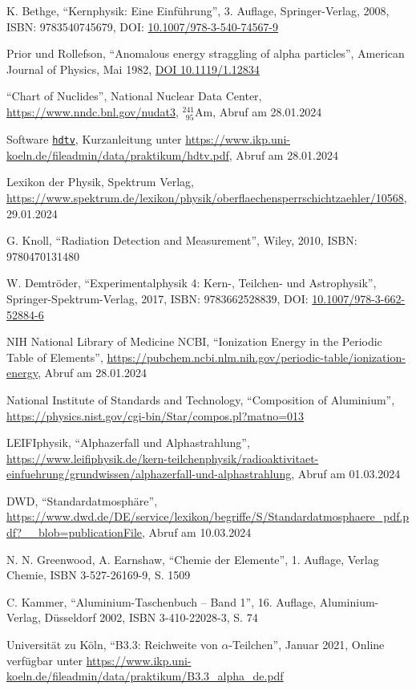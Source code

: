 \documentclass[12pt,a4paper]{scrartcl}
\numberwithin{equation}{section} %
\begin{document}
\begin{thebibliography}{99}
	K. Bethge, ``Kernphysik: Eine Einführung'', 3. Auflage,
	Springer-Verlag, 2008, ISBN: 9783540745679, DOI:
	\href{https://doi.org/10.1007/978-3-540-74567-9}{10.1007/978-3-540-74567-9}

	Prior und Rollefson, ``Anomalous energy straggling of alpha
	particles'', American Journal of Physics, Mai 1982,
	\href{https://doi.org/10.1119/1.12834}{DOI 10.1119/1.12834}

	``Chart of Nuclides'', National Nuclear Data Center,
	\url{https://www.nndc.bnl.gov/nudat3}, $^{241}_{\ \ 95}\mathrm{Am}$,
	Abruf am 28.01.2024

	Software \href{https://pypi.org/project/hdtv}{\texttt{hdtv}},
	Kurzanleitung unter
	\url{https://www.ikp.uni-koeln.de/fileadmin/data/praktikum/hdtv.pdf},
	Abruf am 28.01.2024

	Lexikon der Physik, Spektrum Verlag,
	\url{https://www.spektrum.de/lexikon/physik/oberflaechensperrschichtzaehler/10568},
	29.01.2024

	G. Knoll, ``Radiation Detection and Measurement'', Wiley, 2010, ISBN:
	9780470131480

	W. Demtröder, ``Experimentalphysik 4: Kern-, Teilchen- und
	Astrophysik'', Springer-Spektrum-Verlag, 2017, ISBN: 9783662528839,
	DOI:
	\href{https://doi.org/10.1007/978-3-662-52884-6}{10.1007/978-3-662-52884-6}

	NIH National Library of Medicine NCBI, ``Ionization Energy in the
	Periodic Table of Elements'',
	\url{https://pubchem.ncbi.nlm.nih.gov/periodic-table/ionization-energy},
	Abruf am 28.01.2024
	
	National Institute of Standards and Technology, ``Composition of  Aluminium'',
	\url{https://physics.nist.gov/cgi-bin/Star/compos.pl?matno=013}

	LEIFIphysik, ``Alphazerfall und Alphastrahlung'',
	\url{https://www.leifiphysik.de/kern-teilchenphysik/radioaktivitaet-einfuehrung/grundwissen/alphazerfall-und-alphastrahlung},
	Abruf am 01.03.2024

	DWD, ``Standardatmosphäre'',
	\url{https://www.dwd.de/DE/service/lexikon/begriffe/S/Standardatmosphaere_pdf.pdf?__blob=publicationFile}, Abruf am 10.03.2024

	N. N. Greenwood, A. Earnshaw, ``Chemie der Elemente'', 1. Auflage, Verlag Chemie,
	ISBN 3-527-26169-9, S. 1509

	C. Kammer, ``Aluminium-Taschenbuch -- Band 1'', 16. Auflage, Aluminium-Verlag, Düsseldorf 2002,
	ISBN 3-410-22028-3, S. 74

	Universität zu Köln, ``B3.3: Reichweite von $\alpha$-Teilchen'', Januar 2021, Online verfügbar unter \url{https://www.ikp.uni-koeln.de/fileadmin/data/praktikum/B3.3_alpha_de.pdf}

\end{thebibliography}
\end{document}
